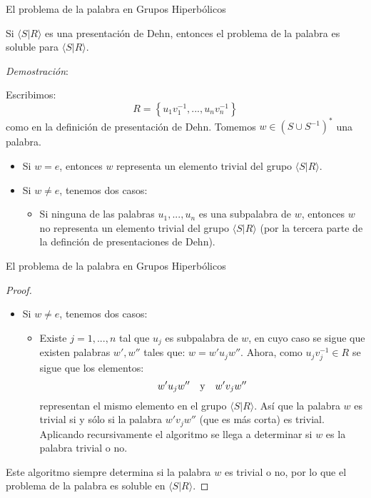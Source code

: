 \documentclass[xcolor=dvipsnames]{beamer}
\theoremstyle{largebreak}
\newcommand{\gen}[1]{\ensuremath{\langle#1\rangle}}
\begin{document}
\begin{frame}{El problema de la palabra en Grupos Hiperbólicos}
    \begin{propo}
        Si $\gen{S|R}$ es una presentación de Dehn, entonces el problema de la palabra es soluble para $\gen{S|R}$.
    \end{propo}
    \textit{Demostración}:

    Escribimos:
    \begin{equation*}
        R=\left\{u_1v_1^{-1},...,u_nv_n^{-1} \right\}
    \end{equation*}
    como en la definición de presentación de Dehn. Tomemos $w\in(S\cup S^{-1})^*$ una palabra.
    \begin{itemize}
        \item Si $w=e$, entonces $w$ representa un elemento trivial del grupo $\gen{S|R}$.
        \item Si $w\neq e$, tenemos dos casos:
        \begin{itemize}
            \item Si ninguna de las palabras $u_1,...,u_n$ es una subpalabra de $w$, entonces $w$ no representa un elemento trivial del grupo $\gen{S|R}$ (por la tercera parte de la definción de presentaciones de Dehn).
        \end{itemize}
    \end{itemize}
\end{frame}

\begin{frame}{El problema de la palabra en Grupos Hiperbólicos}
    \begin{proof}
        \begin{itemize}
            \item Si $w\neq e$, tenemos dos casos:
            \begin{itemize}
                \item Existe $j=1,...,n$ tal que $u_j$ es subpalabra de $w$, en cuyo caso se sigue que existen palabras $w',w''$ tales que: $w=w'u_jw''$. Ahora, como $u_jv_j^{-1}\in R$ se sigue que los elementos:
                \begin{equation*}
                    w'u_jw''\quad\textup{y}\quad w'v_jw''
                \end{equation*}
                representan el mismo elemento en el grupo $\gen{S|R}$. Así que la palabra $w$ es trivial si y sólo si la palabra $w'v_jw''$ (que es más corta) es trivial. Aplicando recursivamente el algoritmo se llega a determinar si $w$ es la palabra trivial o no.
            \end{itemize}
        \end{itemize}
        Este algoritmo siempre determina si la palabra $w$ es trivial o no, por lo que el problema de la palabra es soluble en $\gen{S|R}$.
    \end{proof}
\end{frame}
\end{document}
